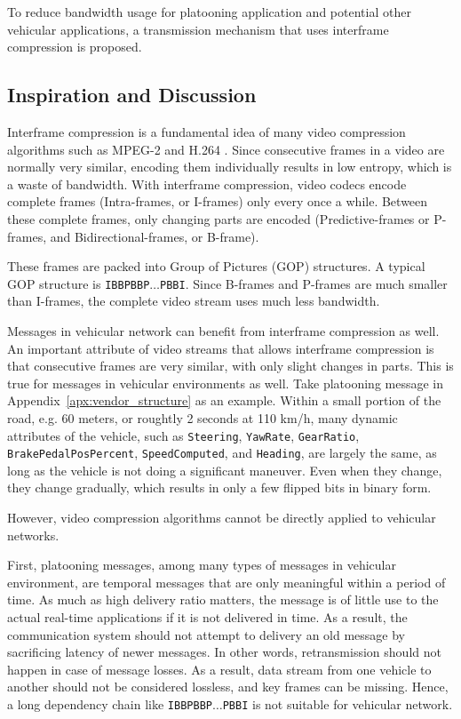\documentclass[12pt]{report}
\begin{document}
To reduce bandwidth usage for platooning application and potential other vehicular applications, a transmission mechanism that uses interframe compression is proposed.

\subsection{Inspiration and Discussion}

Interframe compression is a fundamental idea of many video compression algorithms such as MPEG-2 \cite{le1991mpeg} and H.264 \cite{wiegand2003h264}. Since consecutive frames in a video are normally very similar, encoding them individually results in low entropy, which is a waste of bandwidth. With interframe compression, video codecs encode complete frames (Intra-frames, or I-frames) only every once a while. Between these complete frames, only changing parts are encoded (Predictive-frames or P-frames, and Bidirectional-frames, or B-frame).

These frames are packed into Group of Pictures (GOP) structures. A typical GOP structure is \texttt{IBBPBBP$\ldots$PBBI}. Since B-frames and P-frames are much smaller than I-frames, the complete video stream uses much less bandwidth.

Messages in vehicular network can benefit from interframe compression as well. An important attribute of video streams that allows interframe compression is that consecutive frames are very similar, with only slight changes in parts. This is true for messages in vehicular environments as well. Take platooning message in Appendix~\ref{apx:vendor_structure} as an example. Within a small portion of the road, e.g. 60 meters, or roughtly 2 seconds at 110 km/h, many dynamic attributes of the vehicle, such as \texttt{Steering}, \texttt{YawRate}, \texttt{GearRatio}, \texttt{BrakePedalPosPercent}, \texttt{SpeedComputed}, and \texttt{Heading}, are largely the same, as long as the vehicle is not doing a significant maneuver. Even when they change, they change gradually, which results in only a few flipped bits in binary form.

However, video compression algorithms cannot be directly applied to vehicular networks.

First, platooning messages, among many types of messages in vehicular environment, are temporal messages that are only meaningful within a period of time. As much as high delivery ratio matters, the message is of little use to the actual real-time applications if it is not delivered in time. As a result, the communication system should not attempt to delivery an old message by sacrificing latency of newer messages. In other words, retransmission should not happen in case of message losses. As a result, data stream from one vehicle to another should not be considered lossless, and key frames can be missing. Hence, a long dependency chain like \texttt{IBBPBBP$\ldots$PBBI} is not suitable for vehicular network.
\end{document}
